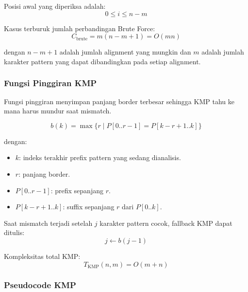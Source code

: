 Posisi awal yang diperiksa adalah:
\begin{equation}
    0 \le i \le n-m
    \label{eq:sm-brute-position}
\end{equation}

Kasus terburuk jumlah perbandingan Brute Force:
\begin{equation}
    C_{\text{brute}}=m(n-m+1)=O(mn)
    \label{eq:sm-brute-comparison}
\end{equation}

dengan $n-m+1$ adalah jumlah alignment yang mungkin dan $m$ adalah jumlah karakter pattern yang dapat dibandingkan pada setiap alignment.

\subsubsection{Fungsi Pinggiran KMP}

\begin{jawab}
Fungsi pinggiran menyimpan panjang border terbesar sehingga KMP tahu ke mana harus mundur saat mismatch.
\end{jawab}

\begin{equation}
    b(k)=\max\{r \mid P[0..r-1]=P[k-r+1..k]\}
    \label{eq:sm-kmp-border}
\end{equation}

dengan:
\begin{itemize}
    \item $k$: indeks terakhir prefix pattern yang sedang dianalisis.
    \item $r$: panjang border.
    \item $P[0..r-1]$: prefix sepanjang $r$.
    \item $P[k-r+1..k]$: suffix sepanjang $r$ dari $P[0..k]$.
\end{itemize}

Saat mismatch terjadi setelah $j$ karakter pattern cocok, fallback KMP dapat ditulis:
\begin{equation}
    j \leftarrow b(j-1)
    \label{eq:sm-kmp-fallback}
\end{equation}

Kompleksitas total KMP:
\begin{equation}
    T_{\text{KMP}}(n,m)=O(m+n)
    \label{eq:sm-kmp-complexity}
\end{equation}

\subsubsection{Pseudocode KMP}


